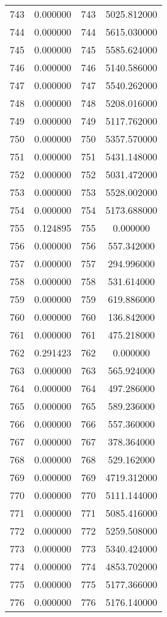 \documentclass[12pt]{article}
\begin{document}
\begin{longtable}{@{}cccc@{}}
743 & 0.000000 & 743 & 5025.812000 \\
744 & 0.000000 & 744 & 5615.030000 \\
745 & 0.000000 & 745 & 5585.624000 \\
746 & 0.000000 & 746 & 5140.586000 \\
747 & 0.000000 & 747 & 5540.262000 \\
748 & 0.000000 & 748 & 5208.016000 \\
749 & 0.000000 & 749 & 5117.762000 \\
750 & 0.000000 & 750 & 5357.570000 \\
751 & 0.000000 & 751 & 5431.148000 \\
752 & 0.000000 & 752 & 5031.472000 \\
753 & 0.000000 & 753 & 5528.002000 \\
754 & 0.000000 & 754 & 5173.688000 \\
755 & 0.124895 & 755 & 0.000000 \\
756 & 0.000000 & 756 & 557.342000 \\
757 & 0.000000 & 757 & 294.996000 \\
758 & 0.000000 & 758 & 531.614000 \\
759 & 0.000000 & 759 & 619.886000 \\
760 & 0.000000 & 760 & 136.842000 \\
761 & 0.000000 & 761 & 475.218000 \\
762 & 0.291423 & 762 & 0.000000 \\
763 & 0.000000 & 763 & 565.924000 \\
764 & 0.000000 & 764 & 497.286000 \\
765 & 0.000000 & 765 & 589.236000 \\
766 & 0.000000 & 766 & 557.360000 \\
767 & 0.000000 & 767 & 378.364000 \\
768 & 0.000000 & 768 & 529.162000 \\
769 & 0.000000 & 769 & 4719.312000 \\
770 & 0.000000 & 770 & 5111.144000 \\
771 & 0.000000 & 771 & 5085.416000 \\
772 & 0.000000 & 772 & 5259.508000 \\
773 & 0.000000 & 773 & 5340.424000 \\
774 & 0.000000 & 774 & 4853.702000 \\
775 & 0.000000 & 775 & 5177.366000 \\
776 & 0.000000 & 776 & 5176.140000 \\

\end{longtable}
\end{document}
